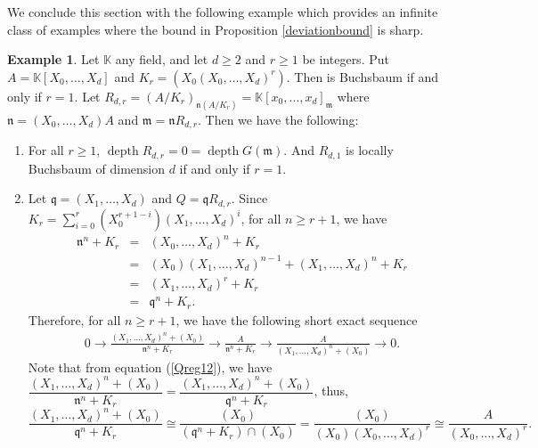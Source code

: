 \documentclass[reqno,a4paper,dvipsnames]{amsart}
\newcommand{\m}{\mathfrak{m} }
\newcommand{\n}{\mathfrak{n} }
\newcommand{\q}{\mathfrak{q} }
\newcommand{\kk}{\mathbb{K}}
\newcommand{\depth}{\operatorname{depth}}
\theoremstyle{definition}
\newtheorem{example}[theorem]{Example}
\begin{document}
 We conclude this section with the following example  which provides an infinite class of examples where the bound in Proposition \ref{deviationbound} is sharp.
\begin{example} \cite[Example~3.6]{goto-yoshida}
\label{example depth 0} 
    Let $\kk$ any field, and let $d \geq 2$ and $r \geq 1$ be integers. Put $A = \kk[X_0, \ldots, X_d]$   and $K_r =  (X_0 (X_0, \ldots, X_d)^r)$. Then is Buchsbaum if and only if $r=1.$ Let 
     $R_{d,r}= (A/ K_r)_{\n (A/K_{r})}= \kk[x_0, \ldots, x_d]_{\m}$ where $\n=(X_0, \ldots, X_d)A$ and $\m =\n R_{d,r}.$
       Then we have the following:
    \begin{enumerate}
    \item 
    For all $r \geq 1$, $\depth R_{d,r} =0 = \depth G({\m})$. And  $R_{d,1}$  is locally Buchsbaum of dimension $d$ if and only if $r=1.$
    

        \item Let  $\q= (X_1, \ldots, X_d)$ and $Q = \q R_{d,r}$.    
        Since $K_r = \displaystyle  \sum_{i=0}^{r} (X_0^{r+1-i}) (X_1, \ldots, X_d)^i$,    
        for all $n \geq r+1$, we have     
 \begin{eqnarray} \label{Qreg12} \nonumber
     \n^n + K_r &=& (X_0, \ldots, X_d)^n + K_r\\ \nonumber
     &=& (X_{0})(X_1, \ldots, X_d)^{n-1}+(X_{1},\ldots,X_{d})^{n} +K_{r}\\ \nonumber
     &=& (X_1, \ldots, X_d)^r +K_{r}\\ 
&=&\q^n + K_r. 
 \end{eqnarray}
Therefore, for all $n \geq r+1$, we have the following short exact sequence 
 \begin{eqnarray} \label{seqabc}
 0 \longrightarrow
  \frac{(X_{1},\ldots,X_{d})^{n}+(X_{0})}{\n^{n}+K_{r}}
   \longrightarrow
      \frac{A}{\n^n + K_r}
      \longrightarrow
 \frac{A}{(X_1, \ldots, X_d)^n + (X_0)} \longrightarrow 0.
 \end{eqnarray}
Note that from equation (\ref{Qreg12}), we have 
$\dfrac{(X_{1},\ldots,X_{d})^{n}+(X_{0})}{\n^{n}+K_{r}}=\dfrac{(X_{1},\ldots,X_{d})^{n}+(X_{0})}{\q^{n}+K_{r}}$, thus, 
$$\frac{(X_{1},\ldots,X_{d})^{n}+(X_{0})}{\q^{n}+K_{r}} \cong \frac{(X_{0})}{(\q^{n}+K_{r})\cap(X_{0})}  = \frac{(X_{0})}{(X_{0})(X_{0},\ldots, X_{d})^{r}}  \cong \frac{A}{(X_{0},\ldots, X_{d})^{r}}.$$



\end{enumerate}
\end{example}
\end{document}
